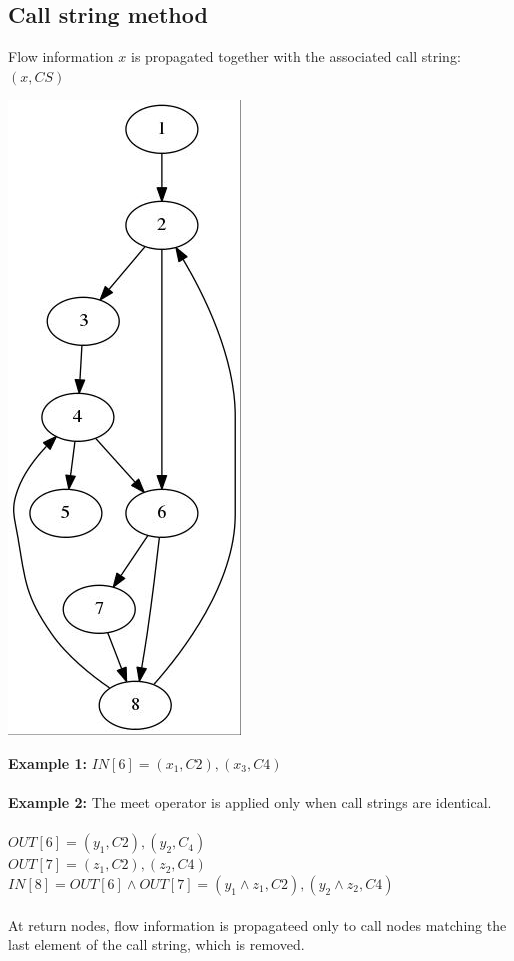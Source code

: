 \documentclass[10pt,a4paper]{article}
\begin{document}
\subsection{Call string method}
Flow information $x$ is propagated together with the associated call string: $(x,CS)$
\begin{center}
\includegraphics[scale=0.5]{img/g2.jpg}
\end{center}
\textbf{Example 1:} $IN[6] = (x_1,C2),(x_3,C4)$\\\\
\textbf{Example 2:} The meet operator is applied only when call strings are identical.\\\\
$OUT[6] = (y_1,C2),(y_2,C_4)$\\
$OUT[7] = (z_1,C2),(z_2,C4)$\\
$IN[8] = OUT[6] \wedge OUT[7] = (y_1 \wedge z_1,C2),(y_2 \wedge z_2,C4)$\\\\
At return nodes, flow information is propagateed only to call nodes matching the last element of the call string, which is removed.
\end{document}
